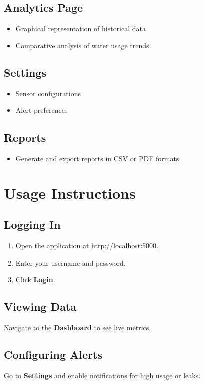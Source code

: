 \documentclass{article}
\begin{document}
\subsection{Analytics Page}
\begin{itemize}
\item Graphical representation of historical data
\item Comparative analysis of water usage trends
\end{itemize}

\subsection{Settings}
\begin{itemize}
\item Sensor configurations
\item Alert preferences
\end{itemize}

\subsection{Reports}
\begin{itemize}
\item Generate and export reports in CSV or PDF formats
\end{itemize}

\section{Usage Instructions}
\subsection{Logging In}
\begin{enumerate}
\item Open the application at \url{http://localhost:5000}.
\item Enter your username and password.
\item Click \textbf{Login}.
\end{enumerate}

\subsection{Viewing Data}
Navigate to the \textbf{Dashboard} to see live metrics.

\subsection{Configuring Alerts}
Go to \textbf{Settings} and enable notifications for high usage or leaks.
\end{document}
